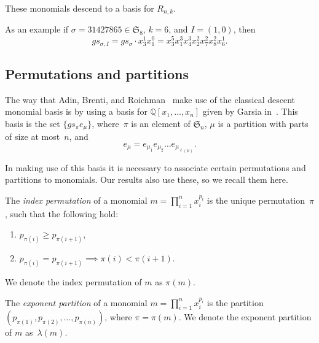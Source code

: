 \documentclass[10pt]{article}
\begin{document}
These monomials descend to a basis for $R_{n,k}$.


As an example if $\sigma=31427865\in \mathfrak{S}_8$, $k=6$, and $I=(1,0)$, then
\begin{equation}
gs_{\sigma, I}=gs_\sigma\cdot 
x_3^1x_1^0=x_3^5x_1^3x_4^3x_2^2x_7^2x_8^2x_6^1.
\end{equation}

\subsection{Permutations and partitions}

The way that Adin, Brenti, and Roichman~\cite{ABR} make use of the classical descent monomial basis is by using a basis for 
$\mathbb{Q}[x_1,\ldots, x_n]$ given by Garsia in~\cite{G}. This basis is the set $\{gs_\pi e_\mu\}$, where~$\pi$ is an 
element of $\mathfrak{S}_n$, $\mu$ is a partition with parts of size at most~$n$, and
		\begin{equation}
e_\mu=e_{\mu_1}e_{\mu_2}\ldots e_{\mu_{\ell(\mu)}}.
\end{equation}

	 In making use of this basis it is necessary to associate certain permutations and partitions to monomials. Our results 
also use these, so we recall them here. 

\begin{defi}

The \emph{index permutation} of a monomial $m=\prod_{i=1}^n x_i^{p_i}$ is the unique permutation~$\pi$, such that the 
following hold:

	\begin{enumerate}

		\item $p_{\pi(i)}\geq p_{\pi(i+1)}$,

		\item $p_{\pi(i)}=p_{\pi(i+1)}\implies \pi(i)<\pi(i+1)$.


	\end{enumerate}

We denote the index permutation of $m$ as $\pi(m)$.

\end{defi}

\begin{defi}

	The \emph{exponent partition} of a monomial $m=\prod_{i=1}^n x_i^{p_i}$ is the partition $(p_{\pi(1)},p_{\pi(2)},\ldots, 
p_{\pi(n)})$, where $\pi=\pi(m)$. We denote the exponent partition of $m$ as~$\lambda(m)$.


\end{defi}
\end{document}
